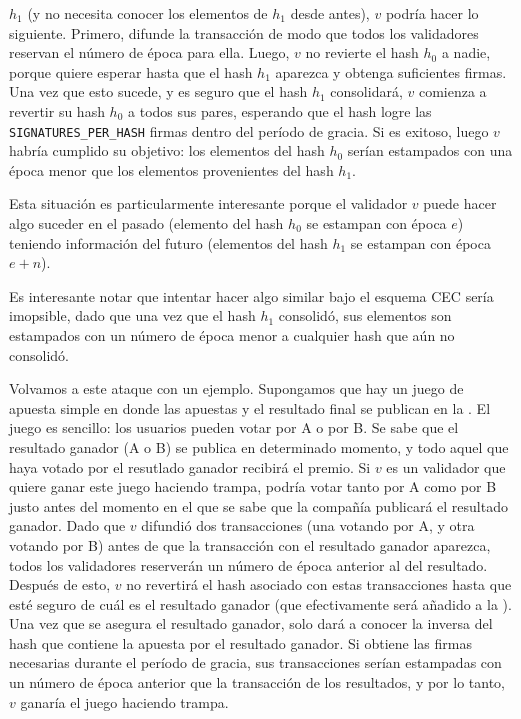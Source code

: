 $h_1$ (y no necesita conocer los elementos de $h_1$ desde antes), $v$ podría hacer lo siguiente.
%
Primero, difunde la transacción de modo que todos los validadores reservan el número de época para ella.
%
Luego, $v$ no revierte el hash $h_0$ a nadie, porque quiere esperar hasta que el hash $h_1$ aparezca
y obtenga suficientes firmas.
%
Una vez que esto sucede, y es seguro que el hash $h_1$ consolidará, $v$ comienza a revertir su hash
$h_0$ a todos sus pares, esperando que el hash logre las \texttt{SIGNATURES\_PER\_HASH} firmas
dentro del período de gracia.
Si es exitoso, luego $v$ habría cumplido su objetivo: los elementos del hash $h_0$ serían estampados
con una época menor que los elementos provenientes del hash $h_1$.
%

Esta situación es particularmente interesante porque el validador $v$ puede hacer algo
suceder en el pasado (elemento del hash $h_0$ se estampan con época $e$) teniendo información
del futuro (elementos del hash $h_1$ se estampan con época $e+n$). 
%

Es interesante notar que intentar hacer algo similar bajo el esquema CEC sería imopsible, dado
que una vez que el hash $h_1$ consolidó, sus elementos son estampados con un número de época menor
a cualquier hash que aún no consolidó.
%

Volvamos a este ataque con un ejemplo. Supongamos que hay un juego de apuesta simple en donde
las apuestas y el resultado final se publican en la \hashchain. El juego es sencillo: los usuarios
pueden votar por A o por B. Se sabe que el resultado ganador (A o B) se publica en determinado momento,
y todo aquel que haya votado por el resutlado ganador recibirá el premio.
%
Si $v$ es un validador que quiere ganar este juego haciendo trampa, podría votar tanto por A
como por B justo antes del momento en el que se sabe que la compañía publicará el resultado ganador.
%
Dado que $v$ difundió dos transacciones (una votando por A, y otra votando por B) antes de que la
transacción con el resultado ganador aparezca, todos los validadores reserverán un número de época
anterior al del resultado. Después de esto, $v$ no revertirá el hash asociado con estas transacciones
hasta que esté seguro de cuál es el resultado ganador (que efectivamente será añadido a la \hashchain).
%
Una vez que se asegura el resultado ganador, solo dará a conocer la inversa del hash que contiene la apuesta
por el resultado ganador. Si obtiene las firmas necesarias durante el período de gracia,
sus transacciones serían estampadas con un número de época anterior que la transacción de los resultados,
y por lo tanto, $v$ ganaría el juego haciendo trampa.


